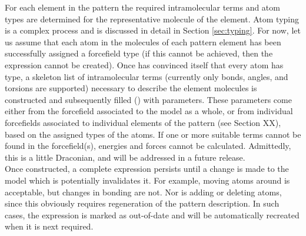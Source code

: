For each element in the pattern the required intramolecular terms and atom types are determined for the representative molecule of the element. Atom typing is a complex process and is discussed in detail in Section \ref{sec:typing}. For now, let us assume that each atom in the molecules of each pattern element has been successfully assigned a forcefield type (if this cannot be achieved, then the expression cannot be created). Once \progname{} has convinced itself that every atom has type, a skeleton list of intramolecular terms (currently only bonds, angles, and torsions are supported) necessary to describe the element molecules is constructed and subsequently filled () with parameters. These parameters come either from the forcefield associated to the model as a whole, or from individual forcefields associated to individual elements of the pattern (see Section XX), based on the assigned types of the atoms. If one or more suitable terms cannot be found in the forcefield(s), energies and forces cannot be calculated. Admittedly, this is a little Draconian, and will be addressed in a future release. \\

Once constructed, a complete expression persists until a change is made to the model which is potentially invalidates it. For example, moving atoms around is acceptable, but changes in bonding are not. Nor is adding or deleting atoms, since this obviously requires regeneration of the pattern description. In such cases, the expression is marked as out-of-date and will be automatically recreated when it is next required.

